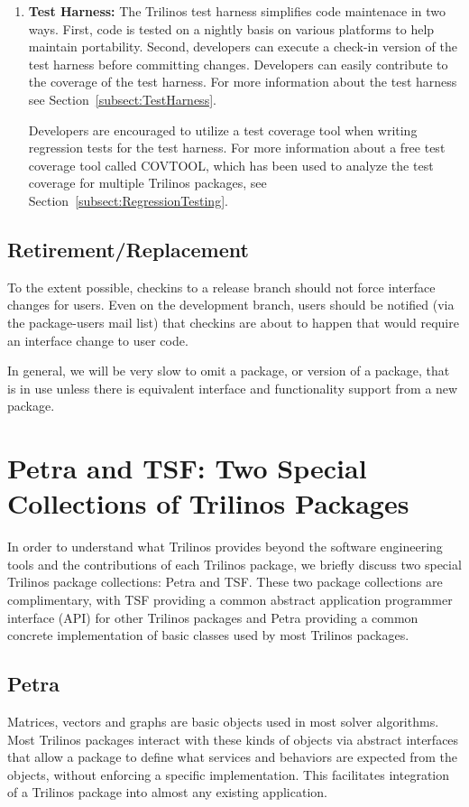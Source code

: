 \documentclass[12pt,relax]{TrilinosDevGuide}
\begin{document}
\begin{enumerate}
\item {\bf Test Harness:} 
The Trilinos test harness simplifies code maintenace in two ways.  First, code 
is tested on a nightly basis on various platforms to help maintain portability.
Second, developers can execute a check-in version of the test harness before 
committing changes.  Developers can easily contribute to the coverage of the 
test harness.  For more information about the test harness see 
Section~\ref{subsect:TestHarness}.

Developers are encouraged to utilize a test coverage tool when writing  
regression tests for the test harness.  For more information about a free test 
coverage tool called COVTOOL, which has been used to analyze the test coverage 
for multiple Trilinos packages, see Section~\ref{subsect:RegressionTesting}.
\end{enumerate}


\subsection{Retirement/Replacement}
To the extent possible, checkins to a release branch should not force 
interface changes for users.  Even on the development branch, users should be 
notified (via the package-users mail list) that checkins are about to happen 
that would require an interface change to user code.

In general, we will be very slow to omit a package, or version of a package, 
that is in use unless there is equivalent interface and functionality support 
from a new package.

\section{Petra and TSF: Two Special Collections of Trilinos Packages}
\label{Section:EpetraAndTSF}
In order to understand what Trilinos provides beyond the software
engineering tools and the
contributions of each Trilinos package, we briefly discuss two special
Trilinos package collections: Petra and TSF.  These two package
collections are complimentary,
with TSF providing a common abstract application
programmer interface (API) for other Trilinos packages and Petra
providing a common concrete implementation of basic classes used by most
Trilinos packages.

\subsection{Petra}
Matrices, vectors and graphs are basic objects used in most solver
algorithms. Most Trilinos
packages interact with these kinds of objects via abstract interfaces that
allow a package to define what services and behaviors are expected from the objects,
without enforcing a specific implementation.   This facilitates
integration of a Trilinos package into almost any existing
application.
\end{document}
